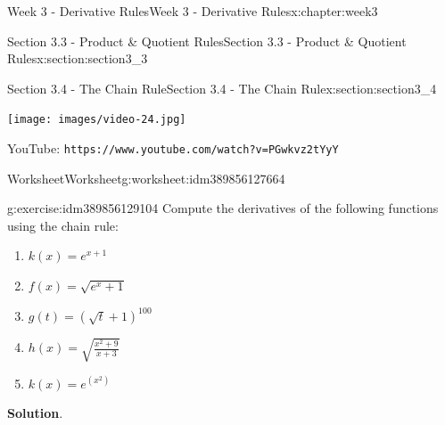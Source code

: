 \documentclass[oneside,10pt,]{book}
\newcommand{\blocktitlefont}{\relax}
\newcommand{\mono}[1]{\texttt{#1}}
\numberwithin{equation}{section}
\newlength{\qrsize}
\newlength{\previewwidth}
\begin{document}
\begin{chapterptx}{Week 3 - Derivative Rules}{}{Week 3 - Derivative Rules}{}{}{x:chapter:week3}
\begin{sectionptx}{Section 3.3 - Product \& Quotient Rules}{}{Section 3.3 - Product \& Quotient Rules}{}{}{x:section:section3_3}
\begin{tcbraster}[raster columns=2, raster column skip=1pt, raster halign=center, raster force size=false, raster left skip=0pt, raster right skip=0pt]
\end{tcbraster}%
\end{sectionptx}
%
%
\typeout{************************************************}
\typeout{************************************************}
%
\begin{sectionptx}{Section 3.4 - The Chain Rule}{}{Section 3.4 - The Chain Rule}{}{}{x:section:section3_4}
\setlength{\qrsize}{9em}
\setlength{\previewwidth}{\linewidth}
\addtolength{\previewwidth}{-\qrsize}
\begin{tcbraster}[raster columns=2, raster column skip=1pt, raster halign=center, raster force size=false, raster left skip=0pt, raster right skip=0pt]%
\begin{tcolorbox}[previewstyle, width=\previewwidth]%
\texttt{[image: images/video-24.jpg]}%
\end{tcolorbox}%
\begin{tcolorbox}[qrstyle]%
{\hypersetup{urlcolor=black}}%
\end{tcolorbox}%
\begin{tcolorbox}[captionstyle]%
\small YouTube: \mono{https://www.youtube.com/watch?v=PGwkvz2tYyY}\end{tcolorbox}%
\end{tcbraster}%
%
%
\typeout{************************************************}
\typeout{************************************************}
%
\begin{worksheet-subsection}{Worksheet}{}{Worksheet}{}{}{g:worksheet:idm389856127664}
\begin{divisionexercise}{1}{}{}{g:exercise:idm389856129104}%
Compute the derivatives of the following functions using the chain rule:%
%
\begin{enumerate}[label=(\alph*)]
\item{}\(\displaystyle k(x) = e^{x+1}\)%
\item{}\(\displaystyle f(x) = \sqrt{e^x +1}\)%
\item{}\(\displaystyle g(t) = (\sqrt{t} + 1)^{100}\)%
\item{}\(\displaystyle h(x) = \sqrt{ \frac{x^2+9}{x+3}}\)%
\item{}\(\displaystyle k(x) = e^{(x^2)}\)%
\end{enumerate}
\textbf{\blocktitlefont Solution}.\hypertarget{g:solution:idm389856139696}{}\quad{}%
\begin{enumerate}[label=(\alph*)]

\end{enumerate}
\end{divisionexercise}
\end{worksheet-subsection}
\end{sectionptx}
\end{chapterptx}
\end{document}
